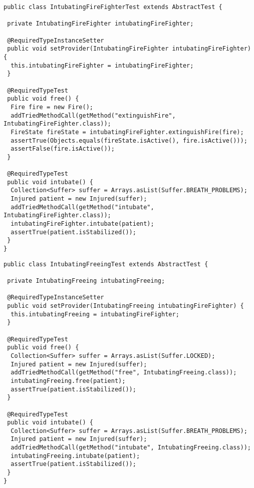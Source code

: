 \pagebreak
\begin{lstlisting}[style = java, caption = Interface IntubatingFireFighterTest, captionpos = b, label = lst_testklassen_tei4]
public class IntubatingFireFighterTest extends AbstractTest {

 private IntubatingFireFighter intubatingFireFighter;
 
 @RequiredTypeInstanceSetter
 public void setProvider(IntubatingFireFighter intubatingFireFighter) {
  this.intubatingFireFighter = intubatingFireFighter;
 }

 @RequiredTypeTest
 public void free() {
  Fire fire = new Fire();
  addTriedMethodCall(getMethod("extinguishFire", IntubatingFireFighter.class));
  FireState fireState = intubatingFireFighter.extinguishFire(fire);
  assertTrue(Objects.equals(fireState.isActive(), fire.isActive()));
  assertFalse(fire.isActive());
 }

 @RequiredTypeTest
 public void intubate() {
  Collection<Suffer> suffer = Arrays.asList(Suffer.BREATH_PROBLEMS);
  Injured patient = new Injured(suffer);
  addTriedMethodCall(getMethod("intubate", IntubatingFireFighter.class));
  intubatingFireFighter.intubate(patient);
  assertTrue(patient.isStabilized());
 }
}
\end{lstlisting}
\pagebreak
\begin{lstlisting}[style = java, caption = Interface IntubatingFreeingTest, captionpos = b, label = lst_testklassen_tei5]
public class IntubatingFreeingTest extends AbstractTest {

 private IntubatingFreeing intubatingFreeing;

 @RequiredTypeInstanceSetter
 public void setProvider(IntubatingFreeing intubatingFireFighter) {
  this.intubatingFreeing = intubatingFireFighter;
 }

 @RequiredTypeTest
 public void free() {
  Collection<Suffer> suffer = Arrays.asList(Suffer.LOCKED);
  Injured patient = new Injured(suffer);
  addTriedMethodCall(getMethod("free", IntubatingFreeing.class));
  intubatingFreeing.free(patient);
  assertTrue(patient.isStabilized());
 }

 @RequiredTypeTest
 public void intubate() {
  Collection<Suffer> suffer = Arrays.asList(Suffer.BREATH_PROBLEMS);
  Injured patient = new Injured(suffer);
  addTriedMethodCall(getMethod("intubate", IntubatingFreeing.class));
  intubatingFreeing.intubate(patient);
  assertTrue(patient.isStabilized());
 }
}
\end{lstlisting}
\pagebreak
